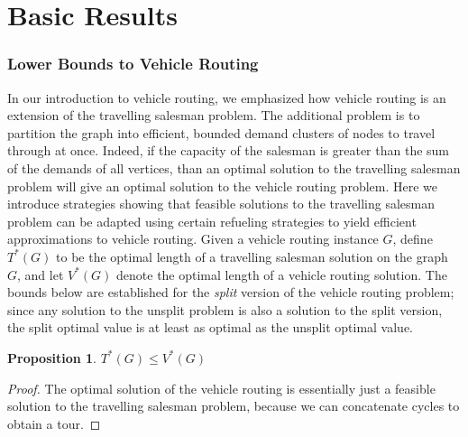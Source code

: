 \documentclass{article}
\theoremstyle{plain}
\theoremstyle{plain}
\newtheorem{proposition}[theorem]{Proposition}
\begin{document}
\part{Basic Results}

\section{Lower Bounds to Vehicle Routing}

In our introduction to vehicle routing, we emphasized how vehicle routing is an extension of the travelling salesman problem. The additional problem is to partition the graph into efficient, bounded demand clusters of nodes to travel through at once. Indeed, if the capacity of the salesman is greater than the sum of the demands of all vertices, than an optimal solution to the travelling salesman problem will give an optimal solution to the vehicle routing problem. Here we introduce strategies showing that feasible solutions to the travelling salesman problem can be adapted using certain refueling strategies to yield efficient approximations to vehicle routing. Given a vehicle routing instance $G$, define $T^*(G)$ to be the optimal length of a travelling salesman solution on the graph $G$, and let $V^*(G)$ denote the optimal length of a vehicle routing solution. The bounds below are established for the {\it split} version of the vehicle routing problem; since any solution to the unsplit problem is also a solution to the split version, the split optimal value is at least as optimal as the unsplit optimal value.

\begin{proposition} $T^*(G) \leq V^*(G)$
\end{proposition}
\begin{proof}
    The optimal solution of the vehicle routing is essentially just a feasible solution to the travelling salesman problem, because we can concatenate cycles to obtain a tour.
\end{proof}
\end{document}
